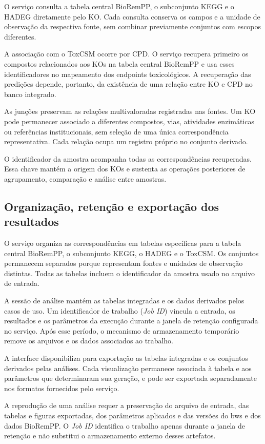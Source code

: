 O serviço consulta a tabela central BioRemPP, o subconjunto KEGG e o HADEG
diretamente pelo KO. Cada consulta conserva os campos e a unidade de observação
da respectiva fonte, sem combinar previamente conjuntos com escopos
diferentes.

A associação com o ToxCSM ocorre por CPD. O serviço recupera primeiro os
compostos relacionados aos KOs na tabela central BioRemPP e usa esses
identificadores no mapeamento dos endpoints toxicológicos. A recuperação das
predições depende, portanto, da existência de uma relação entre KO e CPD no
banco integrado.

As junções preservam as relações multivaloradas registradas nas fontes. Um KO
pode permanecer associado a diferentes compostos, vias, atividades
enzimáticas ou referências institucionais, sem seleção de uma única
correspondência representativa. Cada relação ocupa um registro próprio no
conjunto derivado.

O identificador da amostra acompanha todas as correspondências recuperadas.
Essa chave mantém a origem dos KOs e sustenta as operações posteriores de
agrupamento, comparação e análise entre amostras.

\subsection{Organização, retenção e exportação dos resultados}

O serviço organiza as correspondências em tabelas específicas para a tabela
central BioRemPP, o subconjunto KEGG, o HADEG e o ToxCSM. Os conjuntos
permanecem separados porque representam fontes e unidades de observação
distintas. Todas as tabelas incluem o identificador da amostra usado no
arquivo de entrada.

A sessão de análise mantém as tabelas integradas e os dados derivados pelos
casos de uso. Um identificador de trabalho (\textit{Job ID}) vincula a entrada,
os resultados e os parâmetros da execução durante a janela de retenção
configurada no serviço. Após esse período, o mecanismo de armazenamento
temporário remove os arquivos e os dados associados ao trabalho.

A interface disponibiliza para exportação as tabelas integradas e os conjuntos
derivados pelas análises. Cada visualização permanece associada à tabela e aos
parâmetros que determinaram sua geração, e pode ser exportada separadamente
nos formatos fornecidos pelo serviço.

A reprodução de uma análise requer a preservação do arquivo de entrada, das
tabelas e figuras exportadas, dos parâmetros aplicados e das versões do
\gls{bws} e dos dados BioRemPP. O \textit{Job ID} identifica o trabalho apenas
durante a janela de retenção e não substitui o armazenamento externo desses
artefatos.

